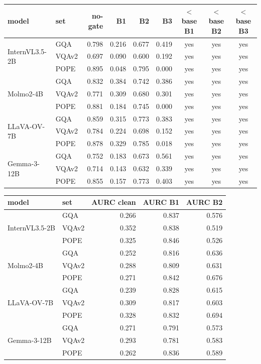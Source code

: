 \vspace{6pt}
\begin{tabular}{@{}ll rrrr ccc@{}}
\toprule
model & set & no-gate & B1 & B2 & B3 & $<$base B1 & $<$base B2 & $<$base B3 \\
\midrule
\multirow{3}{*}{InternVL3.5-2B} & GQA & 0.798 & 0.216 & 0.677 & 0.419 & yes & yes & yes \\
 & VQAv2 & 0.697 & 0.090 & 0.600 & 0.192 & yes & yes & yes \\
 & POPE & 0.895 & 0.048 & 0.795 & 0.000 & yes & yes & yes \\
\midrule
\multirow{3}{*}{Molmo2-4B} & GQA & 0.832 & 0.384 & 0.742 & 0.386 & yes & yes & yes \\
 & VQAv2 & 0.771 & 0.309 & 0.680 & 0.301 & yes & yes & yes \\
 & POPE & 0.881 & 0.184 & 0.745 & 0.000 & yes & yes & yes \\
\midrule
\multirow{3}{*}{LLaVA-OV-7B} & GQA & 0.859 & 0.315 & 0.773 & 0.383 & yes & yes & yes \\
 & VQAv2 & 0.784 & 0.224 & 0.698 & 0.152 & yes & yes & yes \\
 & POPE & 0.878 & 0.329 & 0.785 & 0.018 & yes & yes & yes \\
\midrule
\multirow{3}{*}{Gemma-3-12B} & GQA & 0.752 & 0.183 & 0.673 & 0.561 & yes & yes & yes \\
 & VQAv2 & 0.714 & 0.143 & 0.632 & 0.339 & yes & yes & yes \\
 & POPE & 0.855 & 0.157 & 0.773 & 0.403 & yes & yes & yes \\
\bottomrule
\end{tabular}

\vspace{6pt}
\begin{tabular}{@{}ll rrr@{}}
\toprule
model & set & AURC clean & AURC B1 & AURC B2 \\
\midrule
\multirow{3}{*}{InternVL3.5-2B} & GQA & 0.266 & 0.837 & 0.576 \\
 & VQAv2 & 0.352 & 0.838 & 0.519 \\
 & POPE & 0.325 & 0.846 & 0.526 \\
\midrule
\multirow{3}{*}{Molmo2-4B} & GQA & 0.252 & 0.816 & 0.636 \\
 & VQAv2 & 0.288 & 0.809 & 0.631 \\
 & POPE & 0.271 & 0.842 & 0.676 \\
\midrule
\multirow{3}{*}{LLaVA-OV-7B} & GQA & 0.239 & 0.828 & 0.615 \\
 & VQAv2 & 0.309 & 0.817 & 0.603 \\
 & POPE & 0.328 & 0.832 & 0.694 \\
\midrule
\multirow{3}{*}{Gemma-3-12B} & GQA & 0.271 & 0.791 & 0.573 \\
 & VQAv2 & 0.293 & 0.781 & 0.583 \\
 & POPE & 0.262 & 0.836 & 0.589 \\
\bottomrule
\end{tabular}
